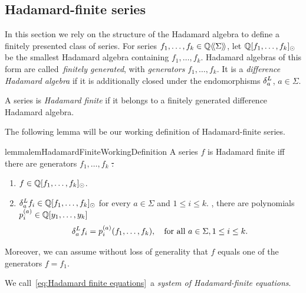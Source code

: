 \subsection{Hadamard-finite series}
\label{sec:Hadamard-finite series}

In this section we rely on the structure of the Hadamard algebra
to define a finitely presented class of series.
%
For series $f_1, \dots, f_k \in \mathbb Q\langle\!\langle\Sigma\rangle\!\rangle$,
let $\mathbb Q[f_1, \dots, f_k]_{\operatorname{\odot}}$ be the smallest Hadamard algebra containing $f_1, \dots, f_k$.
%
Hadamard algebras of this form are called~\emph{finitely generated},
with \emph{generators} $f_1, \dots, f_k$.
%
It is a \emph{difference Hadamard algebra}
if it is additionally closed under the endomorphisms $\delta^L_{a}$, $a \in \Sigma$.
%
\begin{definition}
    \label{def:Hadamard finite}
    A series is \emph{Hadamard finite} if it belongs to a
    finitely generated difference Hadamard algebra.
\end{definition}
%
\noindent
The following lemma will be our working definition of Hadamard-finite series.
%
\begin{restatable}{lemma}{lemHadamardFiniteWorkingDefinition}
    \label{lem:Hadamard finite - working definition}
    A series $f$ is Hadamard finite iff there are generators $f_1, \dots, f_k$ \st:
    \begin{enumerate}
        \item $f \in \mathbb Q[f_1, \dots, f_k]_{\operatorname{\odot}}$.

        \item $\delta^L_{a} f_i \in \mathbb Q[f_1, \dots, f_k]_{\operatorname{\odot}}$
        for every $a \in \Sigma$ and $1 \leq i \leq k$.
        \Ie, there are polynomials $p^{(a)}_i \in \mathbb Q[y_1, \dots, y_k]$ \st
        \begin{align}
            \label{eq:Hadamard finite equations}
            \delta^L_{a} f_i = p^{(a)}_i(f_1, \dots, f_k),
            \quad\text{for all } a \in \Sigma, 1 \leq i \leq k.
        \end{align}
    \end{enumerate}
    Moreover, we can assume without loss of generality that $f$ equals one of the generators $f = f_1$.
\end{restatable}
%
\noindent
We call~\cref{eq:Hadamard finite equations}~a \emph{system of Hadamard-finite equations}.
